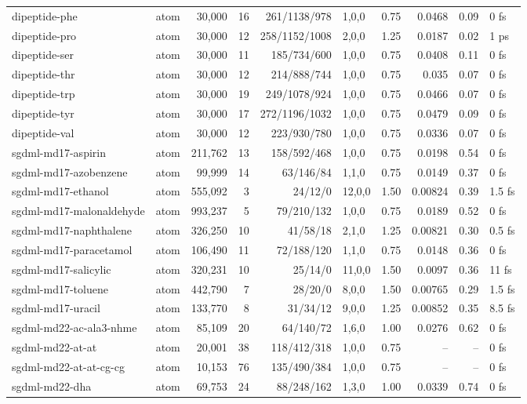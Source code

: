 \begin{small}
\begin{longtable}{llrrrlrrrl}
dipeptide-phe & atom & 30,000 & 16 & 261/1138/978 & 1,0,0 & 0.75 & 0.0468 & 0.09 & 0 fs\\
dipeptide-pro & atom & 30,000 & 12 & 258/1152/1008 & 2,0,0 & 1.25 & 0.0187 & 0.02 & 1 ps\\
dipeptide-ser & atom & 30,000 & 11 & 185/734/600 & 1,0,0 & 0.75 & 0.0408 & 0.11 & 0 fs\\
dipeptide-thr & atom & 30,000 & 12 & 214/888/744 & 1,0,0 & 0.75 & 0.035 & 0.07 & 0 fs\\
dipeptide-trp & atom & 30,000 & 19 & 249/1078/924 & 1,0,0 & 0.75 & 0.0466 & 0.07 & 0 fs\\
dipeptide-tyr & atom & 30,000 & 17 & 272/1196/1032 & 1,0,0 & 0.75 & 0.0479 & 0.09 & 0 fs\\
dipeptide-val & atom & 30,000 & 12 & 223/930/780 & 1,0,0 & 0.75 & 0.0336 & 0.07 & 0 fs\\
sgdml-md17-aspirin & atom & 211,762 & 13 & 158/592/468 & 1,0,0 & 0.75 & 0.0198 & 0.54 & 0 fs\\
sgdml-md17-azobenzene & atom & 99,999 & 14 & 63/146/84 & 1,1,0 & 0.75 & 0.0149 & 0.37 & 0 fs\\
sgdml-md17-ethanol & atom & 555,092 & 3 & 24/12/0 & 12,0,0 & 1.50 & 0.00824 & 0.39 & 1.5 fs\\
sgdml-md17-malonaldehyde & atom & 993,237 & 5 & 79/210/132 & 1,0,0 & 0.75 & 0.0189 & 0.52 & 0 fs\\
sgdml-md17-naphthalene & atom & 326,250 & 10 & 41/58/18 & 2,1,0 & 1.25 & 0.00821 & 0.30 & 0.5 fs\\
sgdml-md17-paracetamol & atom & 106,490 & 11 & 72/188/120 & 1,1,0 & 0.75 & 0.0148 & 0.36 & 0 fs\\
sgdml-md17-salicylic & atom & 320,231 & 10 & 25/14/0 & 11,0,0 & 1.50 & 0.0097 & 0.36 & 11 fs\\
sgdml-md17-toluene & atom & 442,790 & 7 & 28/20/0 & 8,0,0 & 1.50 & 0.00765 & 0.29 & 1.5 fs\\
sgdml-md17-uracil & atom & 133,770 & 8 & 31/34/12 & 9,0,0 & 1.25 & 0.00852 & 0.35 & 8.5 fs\\
sgdml-md22-ac-ala3-nhme & atom & 85,109 & 20 & 64/140/72 & 1,6,0 & 1.00 & 0.0276 & 0.62 & 0 fs\\
sgdml-md22-at-at & atom & 20,001 & 38 & 118/412/318 & 1,0,0 & 0.75 & -- & -- & 0 fs\\
sgdml-md22-at-at-cg-cg & atom & 10,153 & 76 & 135/490/384 & 1,0,0 & 0.75 & -- & -- & 0 fs\\
sgdml-md22-dha & atom & 69,753 & 24 & 88/248/162 & 1,3,0 & 1.00 & 0.0339 & 0.74 & 0 fs\\

\end{longtable}
\end{small}
